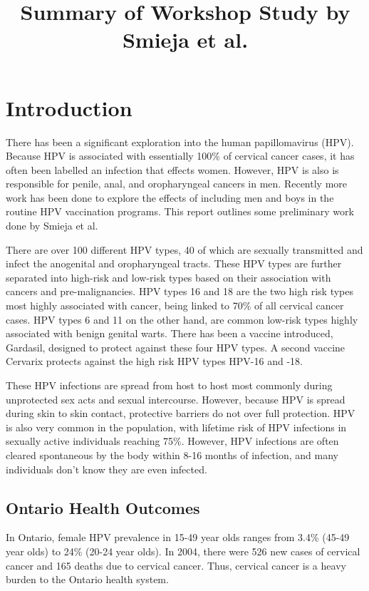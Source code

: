 \documentclass[12pt]{article}
\title{Summary of Workshop Study by Smieja et al.}
\begin{document}
\maketitle

\section{Introduction}

There has been a significant exploration into the human papillomavirus (HPV).  Because HPV is associated with essentially 100\% of cervical cancer cases, it has often been labelled an infection that effects women.  However, HPV is also is responsible for penile, anal, and oropharyngeal cancers in men.  Recently more work has been done to explore the effects of including men and boys in the routine HPV vaccination programs.  This report outlines some preliminary work done by Smieja et al. 

There are over 100 different HPV types, 40 of which are sexually transmitted and infect the anogenital and oropharyngeal tracts. These HPV types are further separated into high-risk and low-risk types based on their association with cancers and pre-malignancies.  HPV types 16 and 18 are the two high risk types most highly associated with cancer, being linked to 70\% of all cervical cancer cases.  HPV types 6 and 11 on the other hand, are common low-risk types highly associated with benign genital warts.  There has been a vaccine introduced, Gardasil, designed to protect against these four HPV types.  A second vaccine Cervarix protects against the high risk HPV types HPV-16 and -18.  

These HPV infections are spread from host to host most commonly during unprotected sex acts and sexual intercourse.  However, because HPV is spread during skin to skin contact, protective barriers do not over full protection.  HPV is also very common in the population, with lifetime risk of HPV infections in sexually active individuals reaching 75\%.  However, HPV infections are often cleared spontaneous by the body within 8-16 months of infection, and many individuals don't know they are even infected. 

\subsection{Ontario Health Outcomes}

In Ontario, female HPV prevalence in 15-49 year olds ranges from 3.4\% (45-49 year olds) to 24\% (20-24 year olds).  In 2004, there were 526 new cases of cervical cancer and 165 deaths due to cervical cancer.  Thus, cervical cancer is a heavy burden to the Ontario health system.  
\end{document}
